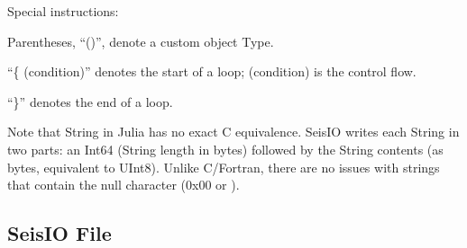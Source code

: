 \documentclass[letterpaper,11pt,english]{sphinxmanual}
\begin{document}
\begin{DUlineblock}{0em}
\item[] Special instructions:
\item[] 
\item[] Parentheses, “()”, denote a custom object Type.
\item[] “\{ (condition)” denotes the start of a loop; (condition) is the control flow.
\item[] “\}” denotes the end of a loop.
\end{DUlineblock}

Note that String in Julia has no exact C equivalence. SeisIO writes each String
in two parts: an Int64 (String length in bytes) followed by the String contents
(as bytes, equivalent to UInt8). Unlike C/Fortran, there are no issues with
strings that contain the null character (0x00 or ).


\subsection{SeisIO File}
\label{\detokenize{src/Appendices/seisio_file_format:seisio-file}}
\end{document}
